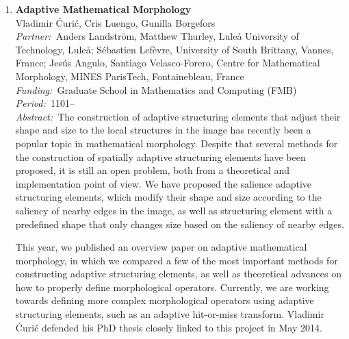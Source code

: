 \documentclass[10pt, a4paper]{article}
\newcommand{\aabstract}[1]{\emph{Abstract:~}#1}
\newcommand{\ffunding}[1]{\emph{Funding:~}#1\\}
\newcommand{\ppartner}[1]{\emph{Partner:~}#1\\}
\newcommand{\pperiod}[1]{\emph{Period:~}#1\\}
\begin{document}
{\begin{enumerate}
{During 2014, we published an efficient, deterministic algorithm that computes the result that one would obtain after an infinite number of repetitions of the seeded watershed (Pattern Recognition Letters), as well as an efficient algorithm to convert this tree-based result back to all edges in the image's graph.

We also submitted a paper that describes a method to combine the perturbation-based approach with the deterministic algorithm. This combined method is much faster than the original perturbation-based method, and improves on its results slightly.}

\item 
\textbf{Adaptive Mathematical Morphology}\\
Vladimir \' Curi\' c, Cris Luengo, Gunilla Borgefors\\
\ppartner{Anders Landstr\"{o}m, Matthew Thurley, Lule\r{a} University of Technology, Lule\r{a}; S\'{e}bastien Lef\`{e}vre, University of South Brittany, Vannes, France; Jes\'{u}s Angulo, Santiago Velasco-Forero, Centre for Mathematical Morphology, MINES ParisTech, Fontainebleau, France}
\ffunding{Graduate School in Mathematics and Computing (FMB)}
\pperiod{1101--}
\aabstract{The construction of adaptive structuring elements that adjust their shape and size to the local structures in the image has recently been a popular topic in mathematical morphology. Despite that several methods for the construction of spatially adaptive structuring elements have been proposed, it is still an open problem, both from a theoretical and implementation point of view. We have proposed the salience adaptive structuring elements, which modify their shape and size according to the saliency of nearby edges in the image, as well as structuring element with a predefined shape that only changes size based on the saliency of nearby edges.

This year, we published an overview paper on adaptive mathematical morphology, in which we compared a few of the most important methods for constructing adaptive structuring elements, as well as theoretical advances on how to properly define morphological operators. Currently, we are working towards defining more complex morphological operators using adaptive structuring elements, such as an adaptive hit-or-miss transform. Vladimir \' Curi\' c defended his PhD thesis closely linked to this project in May 2014.}



\end{enumerate}}
\end{document}
